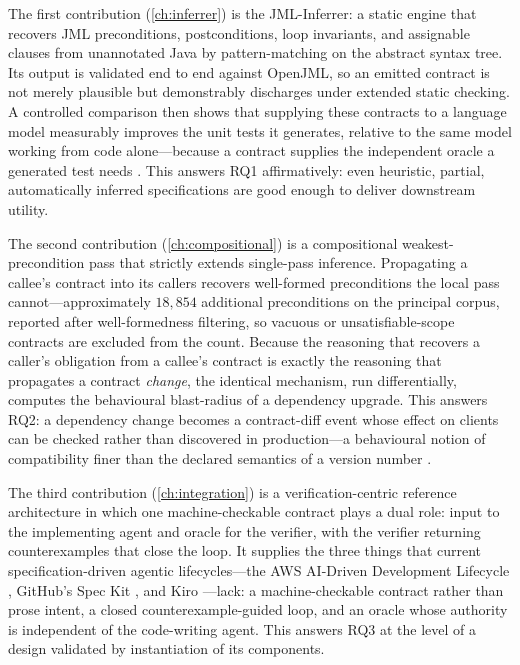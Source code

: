 The first contribution (\cref{ch:inferrer}) is the JML-Inferrer: a static engine
that recovers JML preconditions, postconditions, loop invariants, and assignable
clauses from unannotated Java by pattern-matching on the abstract syntax tree.
Its output is validated end to end against OpenJML, so an emitted contract is not
merely plausible but demonstrably discharges under extended static checking. A
controlled comparison then shows that supplying these contracts to a language
model measurably improves the unit tests it generates, relative to the same model
working from code alone---because a contract supplies the independent oracle a
generated test needs \citep{barr2015oracle}. This answers RQ1 affirmatively: even
heuristic, partial, automatically inferred specifications are good enough to
deliver downstream utility.

The second contribution (\cref{ch:compositional}) is a compositional
weakest-precondition pass that strictly extends single-pass inference. Propagating
a callee's contract into its callers recovers well-formed preconditions the local
pass cannot---approximately $18{,}854$ additional preconditions on the principal
corpus, reported after well-formedness filtering, so vacuous or unsatisfiable-scope
contracts are excluded from the count. Because the reasoning that recovers a
caller's obligation from a callee's contract is exactly the reasoning that
propagates a contract \emph{change}, the identical mechanism, run differentially,
computes the behavioural blast-radius of a dependency upgrade. This answers RQ2: a
dependency change becomes a contract-diff event whose effect on clients can be
checked rather than discovered in production---a behavioural notion of
compatibility finer than the declared semantics of a version number
\citep{preston2013semver}.

The third contribution (\cref{ch:integration}) is a verification-centric
reference architecture in which one machine-checkable contract plays a dual role:
input to the implementing agent and oracle for the verifier, with the verifier
returning counterexamples that close the loop. It supplies the three things that
current specification-driven agentic lifecycles---the AWS AI-Driven Development
Lifecycle \citep{awsaidlc}, GitHub's Spec Kit \citep{githubspeckit}, and Kiro
\citep{awskiro}---lack: a machine-checkable contract rather than prose intent, a
closed counterexample-guided loop, and an oracle whose authority is independent of
the code-writing agent. This answers RQ3 at the level of a design validated by
instantiation of its components.

